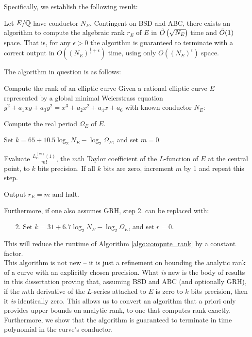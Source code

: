 Specifically, we establish the following result:
\begin{theorem}\label{thm:main_theorem}
Let $E/\mathbb{Q}$ have conductor $N_E$. Contingent on BSD and ABC, there exists an algorithm to compute the algebraic rank $r_E$ of $E$ in $\tilde{O}\left(\sqrt{N_E}\right)$ time and $\tilde{O}(1)$ space. That is, for any $\epsilon>0$ the algorithm is guaranteed to terminate with a correct output in $O\left((N_E)^{\frac{1}{2}+\epsilon}\right)$ time, using only $O\left((N_E)^{\epsilon}\right)$ space.
\end{theorem}
The algorithm in question is as follows:
\begin{algorithm}{Compute the rank of an elliptic curve}\label{algo:compute_rank}
Given a rational elliptic curve $E$ represented by a global minimal Weierstrass equation $y^2 + a_1 xy + a_3 y^2 = x^3 + a_2 x^2 + a_4 x + a_6$ with known conductor $N_E$:
\begin{steps}
\item Compute the real period $\Omega_E$ of $E$.
\item Set $k = 65 + 10.5 \log_2 N_E - \log_2 \Omega_E$, and set $m=0$.
\item Evaluate $\frac{L_E^{(m)}(1)}{m!}$, the $m$th Taylor coefficient of the $L$-function of $E$ at the central point, to $k$ bits precision. If all $k$ bits are zero, increment $m$ by 1 and repeat this step.
\item Output $r_E=m$ and halt.
\end{steps}
\end{algorithm}

Furthermore, if one also assumes GRH, step 2. can be replaced with:
\begin{enumerate}
\item[2.] Set $k = 31 + 6.7 \log_2 N_E - \log_2 \Omega_E$, and set $r=0$.
\end{enumerate}
This will reduce the runtime of Algorithm \ref{algo:compute_rank} by a constant factor. \\

This algorithm is not new -- it is just a refinement on bounding the analytic rank of a curve with an explicitly chosen precision. What {\it is} new is the body of results in this dissertation proving that, assuming BSD and ABC (and optionally GRH), if the $m$th derivative of the $L$-series attached to $E$ is zero to $k$ bits precision, then it {\it is} identically zero. This allows us to convert an algorithm that a priori only provides upper bounds on analytic rank, to one that computes rank exactly. Furthermore, we show that the algorithm is guaranteed to terminate in time polynomial in the curve's conductor. \\

